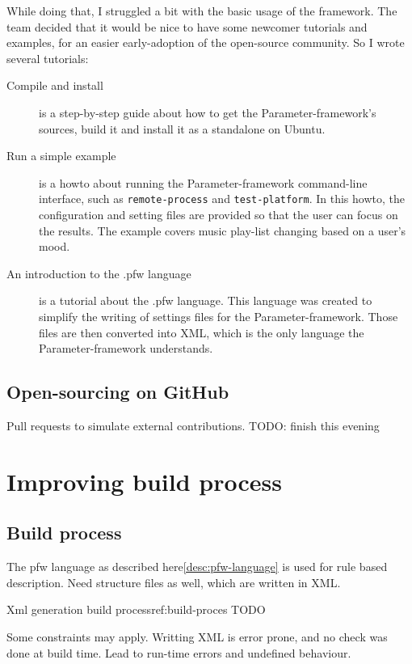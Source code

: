While doing that, I struggled a bit with the basic usage of the framework. The
team decided that it would be nice to have some newcomer tutorials and examples,
for an easier early-adoption of the open-source community. So I wrote several
tutorials:
\begin{description}
    \item[Compile and install]
        is a step-by-step guide about how to get the Parameter-framework's sources,
        build it and install it as a standalone on Ubuntu.
    \item[Run a simple example]
        is a howto about running the Parameter-framework command-line interface,
        such as \lstinline{remote-process} and \lstinline {test-platform}.  In
        this howto, the configuration and setting files are provided so that
        the user can focus on the results. The example covers music play-list
        changing based on a user's mood.
    \item[An introduction to the .pfw language]\label{desc:pfw-language}
        is a tutorial about the .pfw language. This language was
        created to simplify the writing of settings files for the
        Parameter-framework. Those files are then converted into XML, which is
        the only language the Parameter-framework understands.
\end{description}

\subsection{Open-sourcing on GitHub}
Pull requests to simulate external contributions.
TODO: finish this evening

\section{Improving build process}
\subsection{Build process}
The pfw language as described here\ref{desc:pfw-language} is used for rule based
description. Need structure files as well, which are written in XML.

\begin{figureGraphics}{Xml generation build process}{ref:build-proces}
    TODO
\end{figureGraphics}

Some constraints may apply. Writting XML is error prone, and no check was done at
build time. Lead to run-time errors and undefined behaviour.
